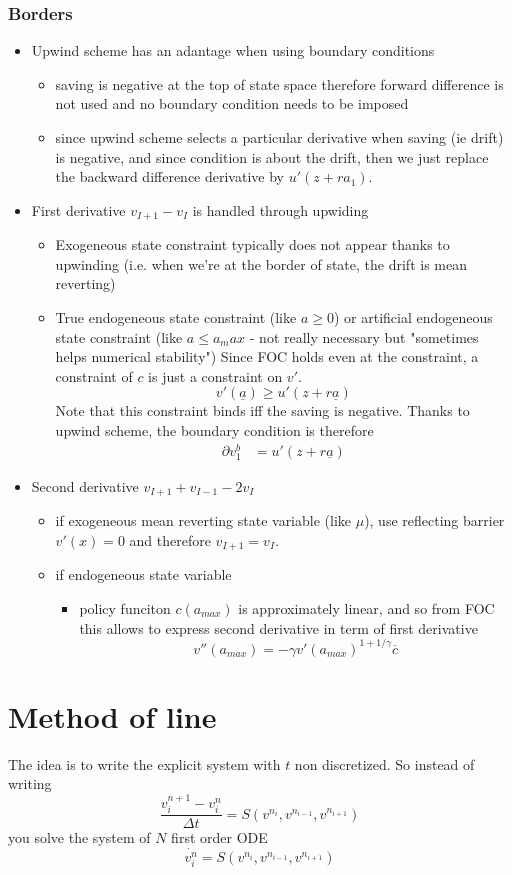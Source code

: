 \documentclass[english]{article}
\begin{document}
\subsubsection{Borders}
\begin{itemize}
	\item Upwind scheme has an adantage when using boundary conditions
	\begin{itemize}
		\item saving is negative at the top of state space therefore forward difference is not used and no boundary condition needs to be imposed
		\item since upwind scheme selects a particular derivative when saving (ie drift) is negative, and since condition is about the drift, then we just replace the backward difference derivative by $u'(z+ra_1)$.
	\end{itemize}
	\item First derivative $v_{I+1}-v_{I}$ is handled through upwiding
	\begin{itemize}
		\item Exogeneous state constraint typically does not appear thanks to upwinding (i.e. when we're at the border of state, the drift is mean reverting)
		\item True endogeneous state constraint (like $a \geq 0$) or artificial endogeneous state constraint (like $a \leq a_max$ - not really necessary but "sometimes helps numerical stability") 
		Since FOC holds even at the constraint,  a constraint of $c$ is just a constraint on $v'$.
		$$v'(\underline{a}) \geq u'(z+ r\underline{a})$$
		Note that this constraint binds iff the saving is negative. Thanks to upwind scheme, the boundary condition is therefore
		\begin{align*}
			\partial v^b_1&= u'(z+ r\underline{a})
		\end{align*}
	\end{itemize}
	\item Second derivative  $v_{I+1}+v_{I-1}-2v_{I}$
	\begin{itemize}
		\item if exogeneous mean reverting state variable (like $\mu$), use reflecting barrier $v'(x) = 0$ and therefore  $v_{I+1}=v_I$.
		\item if endogeneous state variable 
		\begin{itemize}
			\item policy funciton $c(a_{max})$ is approximately linear, and so from FOC this allows to express second derivative in term of first derivative 
			$$v''(a_{max}) = -\gamma v'(a_{max})^{1+1/\gamma} \overline{c}$$
		\end{itemize}
	\end{itemize}
\end{itemize}

\section{Method of line}
The idea is to write the explicit system with $t$ non discretized. So instead of writing
$$\frac{v^{n+1}_i -v^{n}_i}{\Delta t} = S(v^{n_i},v^{n_{i-1}},v^{n_{i+1}})$$
you solve the system of $N$ first order ODE
$$\dot{v_i^n} =  S(v^{n_i},v^{n_{i-1}},v^{n_{i+1}})$$
\end{document}
